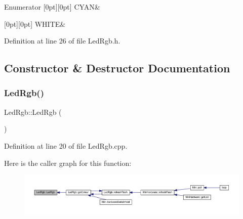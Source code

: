 \begin{DoxyEnumFields}{Enumerator}
[0pt][0pt]{}\mbox{\label{class_led_rgb_af328c665510f921f0dfed643f939087ba1718c136915fce13ae47066acbe861ad}} 
C\+Y\+AN&\\
\hline

[0pt][0pt]{}\mbox{\label{class_led_rgb_af328c665510f921f0dfed643f939087ba00db6e86f434a54a72f54a0efab84aff}} 
W\+H\+I\+TE&\\
\hline

\end{DoxyEnumFields}


Definition at line 26 of file Led\+Rgb.\+h.



\subsection{Constructor \& Destructor Documentation}
\mbox{\label{class_led_rgb_a6393b6af61bd195db3591d4e90a2b6e2}} 
\subsubsection{\texorpdfstring{Led\+Rgb()}{LedRgb()}}
{\footnotesize\ttfamily Led\+Rgb\+::\+Led\+Rgb (\begin{DoxyParamCaption}{ }\end{DoxyParamCaption})}



Definition at line 20 of file Led\+Rgb.\+cpp.

Here is the caller graph for this function\+:
\nopagebreak
\begin{figure}[H]
\begin{center}
\leavevmode
\includegraphics[width=350pt]{class_led_rgb_a6393b6af61bd195db3591d4e90a2b6e2_icgraph}
\end{center}
\end{figure}
\mbox{\label{class_led_rgb_a4fac00de3a6801fd9da322eab7e04765}} 
